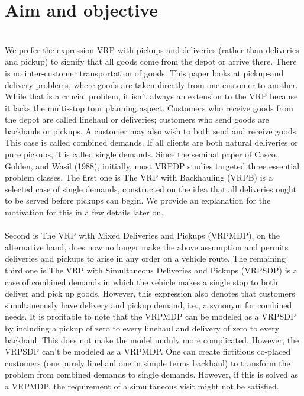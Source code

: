 \documentclass[conference]{IEEEtran}
\begin{document}
{\section{\textbf{Aim and objective}}}   \\

We prefer the expression VRP with pickups and deliveries (rather than deliveries and pickup) to signify that all goods come from the depot or arrive there. There is no inter-customer transportation of goods. This paper looks at pickup-and delivery problems, where goods are taken directly from one customer to another. While that is a crucial problem, it isn't always an extension to the VRP because it lacks the multi-stop tour planning aspect.  Customers who receive goods from the depot are called linehaul or deliveries; customers who send goods are backhauls or pickups. A customer may also wish to both send and receive goods. This case is called combined demands. If all clients are both natural deliveries or pure pickups, it is called single demands.  Since the seminal paper of Casco, Golden, and Wasil (1988), initially, most VRPDP studies targeted three essential problem classes. The first one is The VRP with Backhauling (VRPB) is a selected case of single demands, constructed on the idea that all deliveries ought to be served before pickups can begin. We provide an explanation for the motivation for this in a few details later on.  \\ 
\\
Second is The VRP with Mixed Deliveries and Pickups (VRPMDP), on the alternative hand, does now no longer make the above assumption and permits deliveries and pickups to arise in any order on a vehicle route. The remaining third one is The VRP with Simultaneous Deliveries and Pickups (VRPSDP) is a case of combined demands in which the vehicle makes a single stop to both deliver and pick up goods. However, this expression also denotes that customers simultaneously have delivery and pickup demand, i.e., a synonym for combined needs. It is profitable to note that the VRPMDP can be modeled as a VRPSDP by including a pickup of zero to every linehaul and delivery of zero to every backhaul. This does not make the model unduly more complicated. However, the VRPSDP can't be modeled as a VRPMDP. One can create fictitious co-placed customers (one purely linehaul one in simple terms backhaul) to transform the problem from combined demands to single demands. However, if this is solved as a VRPMDP, the requirement of a simultaneous visit might not be satisfied.\\
\end{document}
